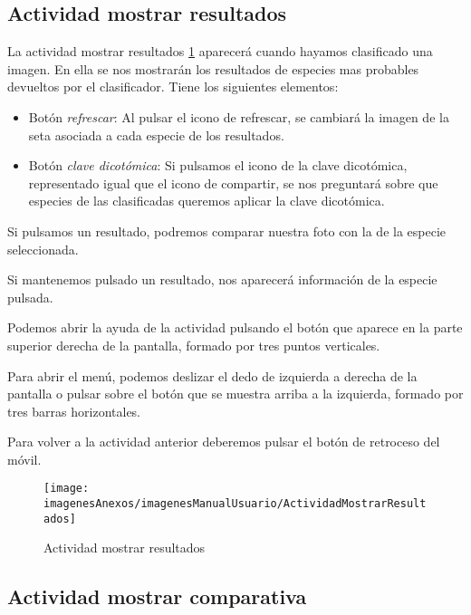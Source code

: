 \subsection{Actividad mostrar resultados}

La actividad mostrar resultados \ref{figActividadMostrarResultados} aparecerá cuando hayamos clasificado una imagen. En ella se nos mostrarán los resultados de especies mas probables devueltos por el clasificador. Tiene los siguientes elementos:

\begin{itemize}
	\item Botón \textit{refrescar}: Al pulsar el icono de refrescar, se cambiará la imagen de la seta asociada a cada especie de los resultados.
	\item Botón \textit{clave dicotómica}: Si pulsamos el icono de la clave dicotómica, representado igual que el icono de compartir, se nos preguntará sobre que especies de las clasificadas queremos aplicar la clave dicotómica.
\end{itemize}

Si pulsamos un resultado, podremos comparar nuestra foto con la de la especie seleccionada.

Si mantenemos pulsado un resultado, nos aparecerá información de la especie pulsada.

Podemos abrir la ayuda de la actividad pulsando el botón que aparece en la parte superior derecha de la pantalla, formado por tres puntos verticales.

Para abrir el menú, podemos deslizar el dedo de izquierda a derecha de la pantalla o pulsar sobre el botón que se muestra arriba a la izquierda, formado por tres barras horizontales.

Para volver a la actividad anterior deberemos pulsar el botón de retroceso del móvil.

\begin{figure}[h]
    \begin{center}%
        \begin{center}%
          \texttt{[image: imagenesAnexos/imagenesManualUsuario/ActividadMostrarResultados]}%
          \caption{Actividad mostrar resultados}%
          \label{figActividadMostrarResultados}%
        \end{center}%
  	\end{center}%
\end{figure}%
\newpage

\subsection{Actividad mostrar comparativa}

